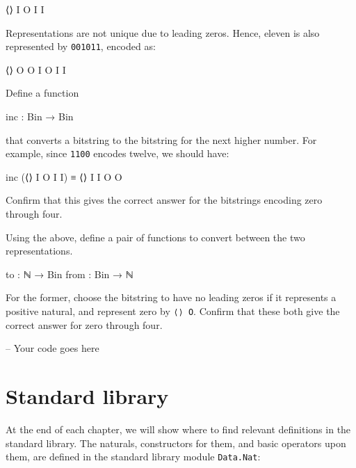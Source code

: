 \begin{myDisplay}
⟨⟩ I O I I
\end{myDisplay}

Representations are not unique due to leading zeros. Hence, eleven is
also represented by \texttt{001011}, encoded as:

\begin{myDisplay}
⟨⟩ O O I O I I
\end{myDisplay}

Define a function

\begin{myDisplay}
inc : Bin → Bin
\end{myDisplay}

that converts a bitstring to the bitstring for the next higher number.
For example, since \texttt{1100} encodes twelve, we should have:

\begin{myDisplay}
inc (⟨⟩ I O I I) ≡ ⟨⟩ I I O O
\end{myDisplay}

Confirm that this gives the correct answer for the bitstrings encoding
zero through four.

Using the above, define a pair of functions to convert between the two
representations.

\begin{myDisplay}
to   : ℕ → Bin
from : Bin → ℕ
\end{myDisplay}

For the former, choose the bitstring to have no leading zeros if it
represents a positive natural, and represent zero by \texttt{⟨⟩\ O}.
Confirm that these both give the correct answer for zero through four.

\begin{fence}
\begin{code}
-- Your code goes here
\end{code}
\end{fence}

\hypertarget{standard-library}{%
\section{Standard library}\label{standard-library}}

At the end of each chapter, we will show where to find relevant
definitions in the standard library. The naturals, constructors for
them, and basic operators upon them, are defined in the standard library
module \texttt{Data.Nat}:

